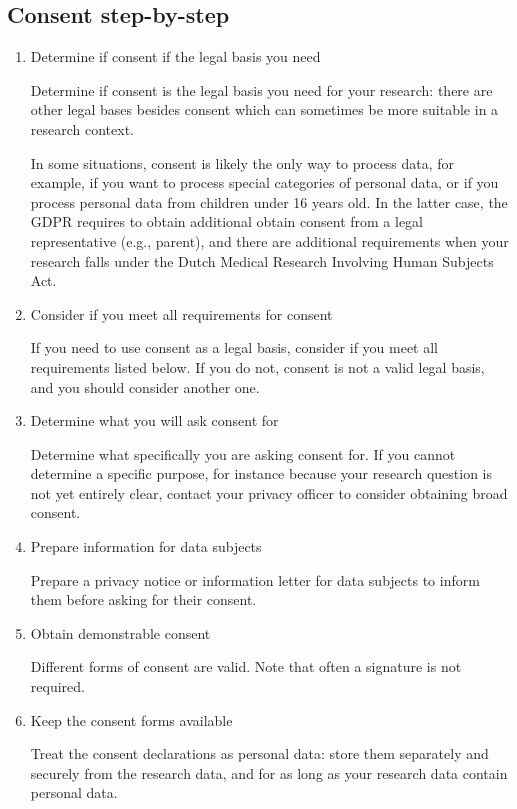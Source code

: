 \documentclass[
]{book}
\begin{document}
\hypertarget{consent-step-by-step}{%
\subsection{Consent step-by-step}\label{consent-step-by-step}}

\begin{enumerate}
\def\labelenumi{\arabic{enumi}.}
\item
  Determine if consent if the legal basis you need

  Determine if consent is the legal basis you need for your
  research: there are other legal bases besides consent which can sometimes be
  more suitable in a research context.

  In some situations, consent is likely the only way to process data, for
  example, if you want to process
  special categories of personal data,
  or if you process personal data from children under 16 years old. In the latter
  case, the GDPR requires to obtain additional obtain consent from a legal
  representative (e.g., parent), and there are additional requirements when your
  research falls under the Dutch
  Medical Research Involving Human Subjects Act.
\item
  Consider if you meet all requirements for consent

  If you need to use consent as a legal basis, consider if you meet
  all requirements listed below. If you do not,
  consent is not a valid legal basis, and you should consider another one.
\item
  Determine what you will ask consent for

  Determine what specifically you are asking consent for. If you cannot
  determine a specific purpose, for instance because your research question is
  not yet entirely clear, contact
  your privacy officer
  to consider obtaining broad consent.
\item
  Prepare information for data subjects

  Prepare a
  privacy notice or information letter
  for data subjects to inform them before asking for their consent.
\item
  Obtain demonstrable consent

  Different forms of consent are valid. Note
  that often a signature is not required.
\item
  Keep the consent forms available

  Treat the consent declarations as personal data:
  store them separately and securely from the
  research data, and for as long as your research data contain personal data.
\end{enumerate}
\end{document}
